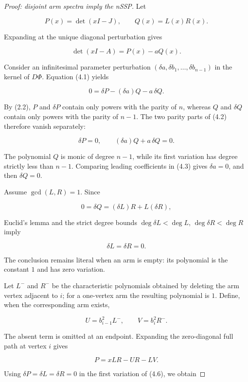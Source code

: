 \documentclass[11pt]{article}
\theoremstyle{remark}
\begin{document}
\begin{proof}[Proof: disjoint arm spectra imply the nSSP]

Let

\[
  P(x)=\det(xI-J),\qquad Q(x)=L(x)R(x).
\]

Expanding at the unique diagonal perturbation gives

\[
  \det(xI-A)=P(x)-aQ(x).                                  \tag{4.1}
\]

Consider an infinitesimal parameter perturbation
$(\delta a,\delta b_1,\ldots,\delta b_{n-1})$ in the kernel of $D\Phi$. Equation (4.1) yields

\[
  0=\delta P-(\delta a)Q-a\,\delta Q.                     \tag{4.2}
\]

By (2.2), $P$ and $\delta P$ contain only powers with the parity of $n$, whereas $Q$ and
$\delta Q$ contain only powers with the parity of $n-1$. The two parity parts of (4.2) therefore
vanish separately:

\[
  \delta P=0,\qquad (\delta a)Q+a\,\delta Q=0.            \tag{4.3}
\]

The polynomial $Q$ is monic of degree $n-1$, while its first variation has degree strictly less
than $n-1$. Comparing leading coefficients in (4.3) gives $\delta a=0$, and then
$\delta Q=0$.

Assume $\gcd(L,R)=1$. Since

\[
  0=\delta Q=(\delta L)R+L(\delta R),                    \tag{4.4}
\]

Euclid's lemma and the strict degree bounds
$\deg\delta L<\deg L$, $\deg\delta R<\deg R$ imply

\[
  \delta L=\delta R=0.                                   \tag{4.5}
\]

The conclusion remains literal when an arm is empty: its polynomial is the constant $1$ and has zero
variation.

Let $L^-$ and $R^-$ be the characteristic polynomials obtained by deleting the arm vertex adjacent
to $i$; for a one-vertex arm the resulting polynomial is $1$. Define, when the corresponding arm
exists,

\[
  U=b_{i-1}^2L^-,
  \qquad
  V=b_i^2R^-.
\]

The absent term is omitted at an endpoint. Expanding the zero-diagonal full path at vertex $i$ gives

\[
  P=xLR-UR-LV.                                            \tag{4.6}
\]

Using $\delta P=\delta L=\delta R=0$ in the first variation of (4.6), we obtain


\end{proof}
\end{document}
